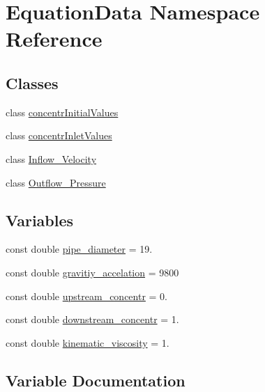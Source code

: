 \hypertarget{namespace_equation_data}{}\section{Equation\+Data Namespace Reference}
\label{namespace_equation_data}
\subsection*{Classes}
\begin{DoxyCompactItemize}
\item 
class \hyperlink{class_equation_data_1_1concentr_initial_values}{concentr\+Initial\+Values}
\item 
class \hyperlink{class_equation_data_1_1concentr_inlet_values}{concentr\+Inlet\+Values}
\item 
class \hyperlink{class_equation_data_1_1_inflow___velocity}{Inflow\+\_\+\+Velocity}
\item 
class \hyperlink{class_equation_data_1_1_outflow___pressure}{Outflow\+\_\+\+Pressure}
\end{DoxyCompactItemize}
\subsection*{Variables}
\begin{DoxyCompactItemize}
\item 
const double \hyperlink{namespace_equation_data_a8a2de541b8b542073fd84d608d36994a}{pipe\+\_\+diameter} = 19.
\item 
const double \hyperlink{namespace_equation_data_aaa67c6160039911ad0a48e345082d6c7}{gravitiy\+\_\+accelation} = 9800
\item 
const double \hyperlink{namespace_equation_data_a104382ed0befd669cf5ec81dfa13425e}{upstream\+\_\+concentr} = 0.
\item 
const double \hyperlink{namespace_equation_data_a4ae0be08a5d532f2c298df33760cb50e}{downstream\+\_\+concentr} = 1.
\item 
const double \hyperlink{namespace_equation_data_a87e6c1ce019dcf40290b9149bf65065b}{kinematic\+\_\+viscosity} = 1.
\end{DoxyCompactItemize}


\subsection{Variable Documentation}
\hypertarget{namespace_equation_data_a4ae0be08a5d532f2c298df33760cb50e}{}
